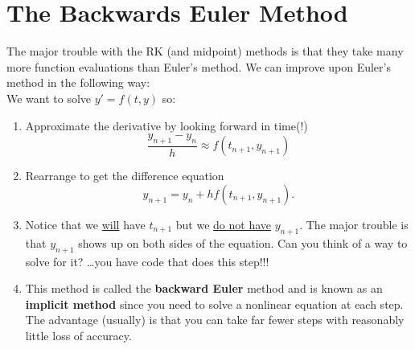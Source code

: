 \newpage\section{The Backwards Euler Method}
\begin{problem}
    The major trouble with the RK (and midpoint) methods is that they take many more
    function evaluations than Euler's method.  We can improve upon Euler's method in the
    following way:\\
    We want to solve $y' = f(t,y)$ so:
    \begin{enumerate}
        \item Approximate the derivative by looking forward in time(!)
            \[ \frac{y_{n+1} - y_n}{h} \approx f(t_{n+1} , y_{n+1}) \]
        \item Rearrange to get the difference equation
            \[ y_{n+1} = y_n + h f(t_{n+1},y_{n+1}). \]
        \item Notice that we \underline{will} have $t_{n+1}$ but we \underline{do not
            have} $y_{n+1}$.  The major trouble is that $y_{n+1}$ shows up on both sides
            of the equation.  Can you think of a way to solve for it? \dots you have code
            that does this step!!!
        \item This method is called the {\bf backward Euler} method and is known as an
            {\bf implicit method} since you need to solve a nonlinear equation at each
            step.  The advantage (usually) is that you can take far fewer steps with
            reasonably little loss of accuracy.
    \end{enumerate}
\end{problem}

